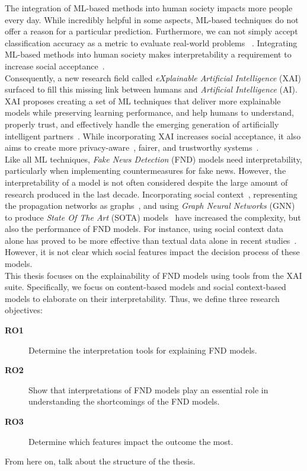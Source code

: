 The integration of ML-based methods into human society impacts more people every day. While incredibly helpful in some aspects,
ML-based techniques do not offer a reason for a particular prediction. Furthermore, we can not simply accept classification accuracy
as a metric to evaluate real-world problems ~\parencite{TowardsARigorousScienceML_Velez}. Integrating ML-based methods into human society
makes interpretability a requirement to increase social acceptance~\parencite{InterpretableMachineLearning_Molnar}.\\
Consequently, a new research field called \emph{eXplainable Artificial Intelligence} (XAI) surfaced to fill this missing link between humans and
\emph{Artificial Intelligence} (AI). XAI proposes creating a set of ML techniques that deliver more explainable models while preserving learning performance, and help humans to understand, properly trust, and effectively handle the emerging generation of artificially intelligent partners~\parencite{XAI_Gunning}. While incorporating XAI increases social acceptance, it also aims to create more privacy-aware~\parencite{SlaveToTheAlgorithm_EdwardsVeale}, fairer, and trustworthy systems~\parencite{TheMythosOfModelInterpretability_Lipton}.\\
Like all ML techniques, \emph{Fake News Detection} (FND) models need interpretability, particularly when implementing countermeasures for fake
news. However, the interpretability of a model is not often considered despite the large amount of research produced in the last decade.
Incorporating social context~\parencite{FakeNewsNet_Shu}, representing the propagation networks as graphs~\parencite{UPFD_Dataset_Shu},
and using \emph{Graph Neural Networks} (GNN) to produce \emph{State Of The Art} (SOTA) models~\parencite{FakeNewsDetectionUsingGeometricDeepLearning_Monti} have increased the complexity, but also the performance of FND models.
For instance, using social context data alone has proved to be more effective than textual data alone in recent studies~\parencite{UPFD_Dataset_Shu}. However, it is not clear which social features impact the decision process of these models.\\
This thesis focuses on the explainability of FND models using tools from the XAI suite. Specifically, we focus on content-based models and social context-based models to elaborate on their interpretability. Thus, we define three research objectives:
\begin{description}
    \item[\textbf{RO1}] Determine the interpretation tools for explaining FND models.
    \item[\textbf{RO2}] Show that interpretations of FND models play an essential role in understanding the shortcomings of the FND models.
    \item[\textbf{RO3}] Determine which features impact the outcome the most.
\end{description}
From here on, talk about the structure of the thesis.



